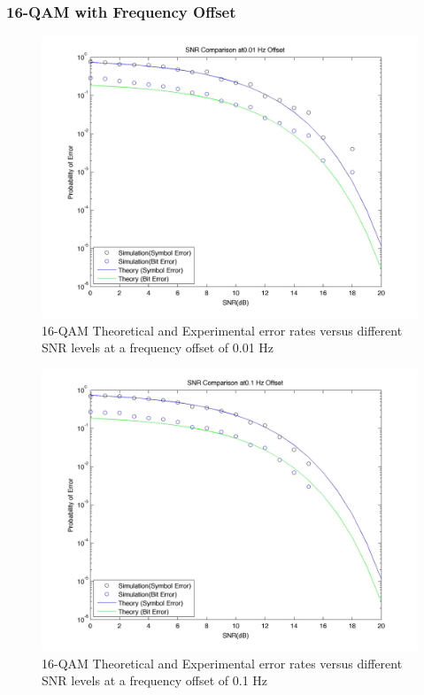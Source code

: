 \documentclass[]{article}
\begin{document}
\subsubsection{16-QAM with Frequency Offset}
\begin{figure}[H]
\centering
\hspace*{-2cm}\includegraphics[width=1.3\textwidth]{qam16SNRfo1.jpg}
\caption{16-QAM Theoretical and Experimental error rates versus different SNR levels at a frequency offset of 0.01 Hz}
\end{figure}

\begin{figure}[H]
\centering
\hspace*{-2cm}\includegraphics[width=1.3\textwidth]{qam16SNRfo2.jpg}
\caption{16-QAM Theoretical and Experimental error rates versus different SNR levels at a frequency offset of 0.1 Hz}
\end{figure}
\end{document}
